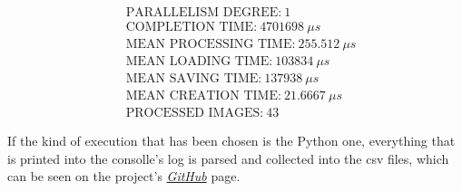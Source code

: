         \begin{align*}
            &\text{PARALLELISM DEGREE:} \ 1 \\
            &\text{COMPLETION TIME:} \ 4701698 \ \mu s \\
            &\text{MEAN PROCESSING TIME:} \ 255.512 \ \mu s \\
            &\text{MEAN LOADING TIME:} \ 103834 \ \mu s \\
            &\text{MEAN SAVING TIME:} \ 137938 \ \mu s \\
            &\text{MEAN CREATION TIME:} \ 21.6667 \ \mu s \\
            &\text{PROCESSED IMAGES:} \ 43
        \end{align*}

        If the kind of execution that has been chosen is the Python one, everything that is printed into the
        consolle's log is parsed and collected into the csv files, which can be seen on the project's
        \href{https://github.com/germz01/PDS_project}{\textit{GitHub}} page.
